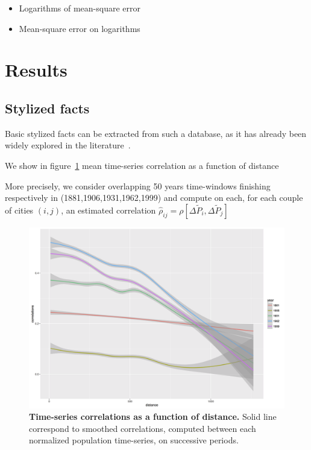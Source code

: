 \documentclass[Royal,sageh,times]{sagej}
\begin{document}
\begin{itemize}
\item Logarithms of mean-square error
\item Mean-square error on logarithms
\end{itemize}







\section*{Results}




\subsection*{Stylized facts}

Basic stylized facts can be extracted from such a database, as it has already been widely explored in the literature~\cite{guerin1990150}.

We show in figure~\ref{fig:ts-correlations} mean time-series correlation as a function of distance

More precisely, we consider overlapping 50 years time-windows finishing respectively in (1881,1906,1931,1962,1999) and compute on each, for each couple of cities $(i,j)$, an estimated correlation $\hat{\rho}_{ij}=\rho\left[\Delta \tilde{P}_i, \Delta \tilde{P}_j\right]$



\begin{figure}
\centering
\includegraphics[width=\textwidth]{figures/Fig1}
\caption{\textbf{Time-series correlations as a function of distance.} Solid line correspond to smoothed correlations, computed between each normalized population time-series, on successive periods.}
\label{fig:ts-correlations}
\end{figure}
\end{document}
